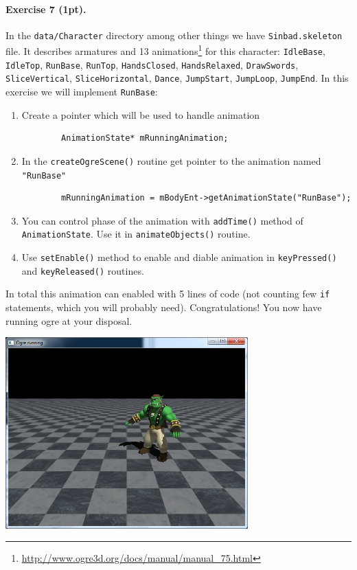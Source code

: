 \documentclass{article}
\newenvironment{exercise}[2]{\paragraph{Exercise #1 (#2pt).} }{
\medskip}
\begin{document}
\begin{exercise}{7}{1}
In the \verb#data/Character# directory among other things we have \verb#Sinbad.skeleton# file. It describes armatures and 13 animations\footnote{\url{http://www.ogre3d.org/docs/manual/manual_75.html}} for this character: \verb#IdleBase#, \verb#IdleTop#, \verb#RunBase#, \verb#RunTop#, \verb#HandsClosed#, \verb#HandsRelaxed#, \verb#DrawSwords#, \verb#SliceVertical#, \verb#SliceHorizontal#, \verb#Dance#, \verb#JumpStart#, \verb#JumpLoop#, \verb#JumpEnd#. In this exercise we will implement \verb#RunBase#:
\begin{enumerate}
	\item Create a pointer which will be used to handle animation
		\begin{verbatim}
		AnimationState* mRunningAnimation;
		\end{verbatim}
	\item In the \verb#createOgreScene()# routine get pointer to the animation named \verb#"RunBase"#
		\begin{verbatim}
		mRunningAnimation = mBodyEnt->getAnimationState("RunBase");
		\end{verbatim} 
	\item You can control phase of the animation with \verb#addTime()# method of \verb#AnimationState#. Use it in \verb#animateObjects()# routine.
	\item Use \verb#setEnable()# method to enable and diable animation in \verb#keyPressed()# and \verb#keyReleased()# routines.
\end{enumerate}
In total this animation can enabled with 5 lines of code (not counting few \verb#if# statements, which you will probably need). Congratulations! You now have running ogre at your disposal.
\end{exercise}

\begin{center}
\includegraphics[width=0.7\textwidth]{meshanim.png}
\end{center}
\end{document}

